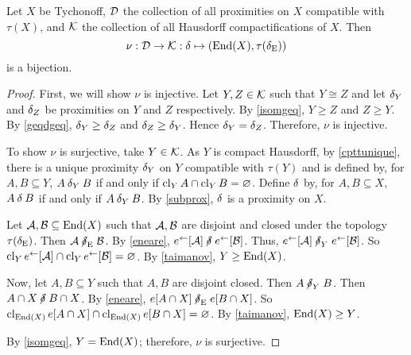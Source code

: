\begin{theorem}
	Let \( X \) be Tychonoff, \( \mathcal{D} \) the collection of all proximities on \( X \) compatible with \( \tau(X) \), and \( \mathcal{K} \) the collection of all Hausdorff compactifications of \( X \).  Then
	\[ \nu: \mathcal{D} \to \mathcal{K}: \mathord{\delta} \mapsto (\operatorname{End}(X),\tau(\mathrel{\delta_\text{E}})) \]
	is a bijection.
\end{theorem}
\begin{proof}
	First, we will show \( \nu \) is injective.  Let \( Y,Z \in \mathcal{K} \) such that \( Y \cong Z \) and let \( \mathord{\delta}_Y \) and \( \mathord{\delta}_Z \) be proximities on \( Y \) and \( Z \) respectively.  By \ref{isomgeq}, \( Y \geq Z \) and \( Z \geq Y \).  By \ref{geqdgeq}, \( \mathord{\delta}_Y \geq \mathord{\delta}_Z \) and \( \mathord{\delta}_Z \geq \mathord{\delta}_Y \).  Hence \( \mathord{\delta}_Y = \mathord{\delta}_Z \).  Therefore, \( \nu \) is injective.
	
	To show \( \nu \) is surjective, take \( Y \in \mathcal{K} \).  As \( Y \) is compact Hausdorff, by \ref{cpttunique}, there is a unique proximity \( \mathord{\delta}_Y \) on \( Y \) compatible with \( \tau(Y) \) and is defined by, for \( A,B \subseteq Y \), \( A \mathbin{\delta}_Y B \) if and only if \( \operatorname{cl}_Y{A} \cap \operatorname{cl}_Y{B} = \varnothing \).  Define \( \mathord{\delta} \) by, for \( A,B \subseteq X \), \( A \mathbin{\delta} B \) if and only if \( A \mathbin{\delta}_Y B \).  By \ref{subprox}, \( \mathbin{\delta} \) is a proximity on \( X \).
	
	Let \( \mathcal{A},\mathcal{B} \subseteq \operatorname{End}(X) \) such that \( \mathcal{A}, \mathcal{B} \) are disjoint and closed under the topology \( \tau(\mathord{\delta}_\text{E}) \).  Then \( \cA \nneare \cB \).  By \ref{eneare}, \( e^\leftarrow[\cA] \nnear e^\leftarrow[\cB] \).  Thus, \( e^\leftarrow[\cA] \nnear_Y e^\leftarrow[\cB] \).  So \( \operatorname{cl}_Y{e^\leftarrow[\mathcal{A}]} \cap \operatorname{cl}_Y{e^\leftarrow[\mathcal{B}]} = \varnothing \).  By \ref{taimanov}, \( Y \geq \operatorname{End}(X) \).
	
	Now, let \( A,B \subseteq Y \) such that \( A,B \) are disjoint closed.  Then \( A \nnear_Y B \).  Then \( A \cap X \nnear B \cap X \).  By \ref{eneare}, \( e[A \cap X] \nneare e[B \cap X] \).  So \( \operatorname{cl}_{\operatorname{End}(X)}{e[A \cap X]} \cap \operatorname{cl}_{\operatorname{End}(X)}{e[B \cap X]} = \varnothing \).  By \ref{taimanov}, \( \operatorname{End}(X) \geq Y \).
	
	By \ref{isomgeq}, \( Y = \operatorname{End}(X) \); therefore, \( \nu \) is surjective.
\end{proof}
